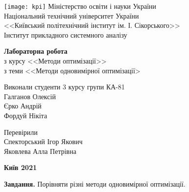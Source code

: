 \documentclass{extreport}
\begin{document}
\begin{titlepage}
    \thispagestyle{empty}
    \begin{center}
        \texttt{[image: kpi]}
        Міністерство освіти і науки України\\
        Національний технічний університет України\\
        <<Київський політехнічний інститут ім. І. Сікорського>>\\
        Інститут прикладного системного аналізу
    \end{center}
    \vspace{40mm}
    \begin{center}
        \textbf{Лабораторна робота} \\
        з курсу <<Методи оптимізації>> \\
        з теми <<Методи одновимірної оптимізації>
    \end{center}
    \vspace{20mm}
    \begin{flushleft}
        Виконали студенти 3 курсу групи КА-81 \\
        Галганов Олексій \\
        Єрко Андрій \\
        Фордуй Нікіта
    \end{flushleft}
    \begin{flushright}
        Перевірили \\
        Спекторський Ігор Якович \\
        Яковлева Алла Петрівна
    \end{flushright}
    \vspace{30mm}
    \begin{center}
        \textbf{Київ 2021}
    \end{center}
\end{titlepage}

\noindent\textbf{Завдання.} Порівняти різні методи одновимірної оптимізації.
\end{document}
